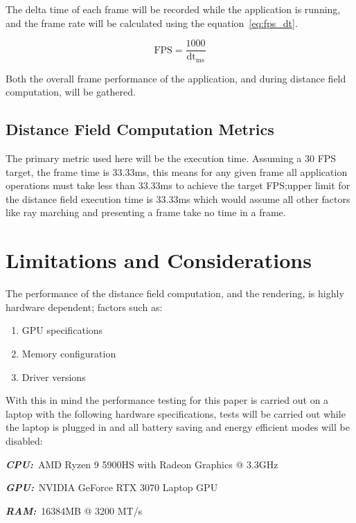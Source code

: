 The delta time of each frame will be recorded while the application is running, and the frame rate will be calculated
using the equation~\ref{eq:fps_dt}.

\begin{equation}\label{eq:fps_dt}
  \text{FPS} = \frac{1000}{\text{dt}_{\text{ms}}}
\end{equation}

Both the overall frame performance of the application, and during distance field computation, will be gathered.

\subsection{Distance Field Computation Metrics}\label{sec:distance_field_metrics}
The primary metric used here will be the execution time. Assuming a 30 FPS target, the frame time is 33.33ms, this means
for any given frame all application operations must take less than 33.33ms to achieve the target FPS;\@the upper
limit for the distance field execution time is 33.33ms which would assume all other factors like ray marching and
presenting a frame take no time in a frame.

\section{Limitations and Considerations}
The performance of the distance field computation, and the rendering, is highly hardware dependent; factors such as:

\begin{enumerate}
  \item GPU specifications
  \item Memory configuration
  \item Driver versions
\end{enumerate}

With this in mind the performance testing for this paper is carried out on a laptop with the following hardware
specifications, tests will be carried out while the laptop is plugged in and all battery saving and energy efficient
modes will be disabled:

\begin{description}
  \item \textbf{\textit{CPU:}}~AMD Ryzen 9 5900HS with Radeon Graphics @ 3.3GHz
  \item \textbf{\textit{GPU:}}~NVIDIA GeForce RTX 3070 Laptop GPU
  \item \textbf{\textit{RAM:}}~16384MB @ 3200 MT/s
\end{description}
